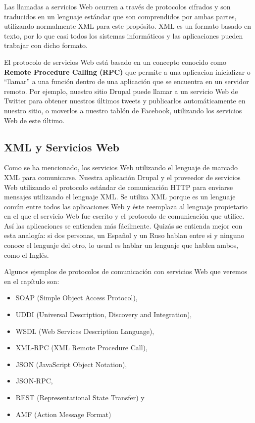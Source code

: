 Las llamadas a servicios Web ocurren a través de protocolos cifrados y son traducidos en un lenguaje
estándar que son comprendidos por ambas partes, utilizando normalmente XML para este propósito. 
XML es un formato basado en texto, por lo que casi todos los sistemas informáticos y las aplicaciones 
pueden trabajar con dicho formato.

El protocolo de servicios Web está basado en un concepto conocido como \textbf{Remote Procedure Calling (RPC)}
que permite a una aplicacion inicializar o ``llamar'' a una función dentro de una aplicación que se 
encuentra en un servidor remoto. Por ejemplo, nuestro sitio Drupal puede llamar a un servicio Web de 
Twitter para obtener nuestros últimos tweets y publicarlos automáticamente en nuestro sitio, o 
moverlos a nuestro tablón de Facebook, utilizando los servicios Web de este último.

\subsection{XML y Servicios Web}

Como se ha mencionado, los servicios Web utilizando el lenguaje de marcado XML para comunicarse.
Nuestra aplicación Drupal y el proveedor de servicios Web utilizando el protocolo estándar de comunicación 
HTTP para enviarse mensajes utilizando el lenguaje XML. Se utiliza XML porque es un lenguaje común entre 
todos las aplicaciones Web y éste reemplaza al lenguaje propietario en el que el servicio Web fue escrito
y el protocolo de comunicación que utilice. Así las aplicaciones se entienden más fácilmente. Quizás se 
entienda mejor con esta analogía: si dos personas, un Español y un Ruso hablan entre si y ninguno conoce 
el lenguaje del otro, lo usual es hablar un lenguaje que hablen ambos, como el Inglés. 

Algunos ejemplos de protocolos de comunicación con servicios Web que veremos en el capítulo son:
\begin{itemize}
  \item SOAP (Simple Object Access Protocol), 
  \item UDDI (Universal Description, Discovery and Integration),
  \item WSDL (Web Services Description Language),
  \item XML-RPC (XML Remote Procedure Call),
  \item JSON (JavaScript Object Notation),
  \item JSON-RPC,
  \item REST (Representational State Transfer) y
  \item AMF (Action Message Format)  
\end{itemize} 

